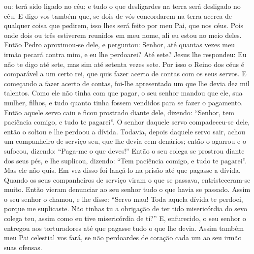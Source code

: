 {{ou: terá sido ligado
} no céu; e tudo o que desligardes na terra será desligado
 no céu.
  E digo-vos também que, se dois de vós concordarem na terra acerca de qualquer coisa que pedirem, isso lhes será feito por meu Pai, que
{} nos céus.
  Pois onde dois ou três estiverem reunidos em meu nome, ali eu estou no meio deles.
  Então Pedro aproximou-se dele, e perguntou: Senhor, até quantas vezes meu irmão pecará contra mim, e eu lhe perdoarei? Até sete?
  Jesus lhe respondeu: Eu não te digo até sete, mas sim até setenta vezes sete.
  Por isso o Reino dos céus é comparável a um certo rei, que quis fazer acerto de contas com os seus servos.
  E começando a fazer acerto de contas, foi-lhe apresentado um que lhe devia dez mil talentos.
  Como ele não tinha com que pagar, o seu senhor mandou que ele, sua mulher, filhos, e tudo quanto tinha fossem vendidos para se fazer o pagamento.
  Então aquele servo caiu e ficou prostrado diante dele, dizendo: “Senhor, tem paciência comigo, e tudo te pagarei”.
  O senhor daquele servo compadeceu-se dele, então o soltou e lhe perdoou a dívida.
  Todavia, depois daquele servo sair, achou um companheiro de serviço seu, que lhe devia cem denários;
 então o agarrou e o sufocou, dizendo: “Paga-me o que
{} deves!”
  Então o seu colega se prostrou diante dos seus pés, e lhe suplicou, dizendo: “Tem paciência comigo, e tudo te pagarei”.
  Mas ele não quis. Em vez disso foi lançá-lo na prisão até que pagasse a dívida.
  Quando os seus companheiros de serviço viram o que se passava, entristeceram-se muito. Então vieram denunciar ao seu senhor tudo o que havia se passado.
  Assim o seu senhor o chamou, e lhe disse: “Servo mau! Toda aquela dívida te perdoei, porque me suplicaste.
  Não tinhas tu a obrigação de ter tido misericórdia do sevo colega teu, assim como eu tive misericórdia de ti?”
  E, enfurecido, o seu senhor o entregou aos torturadores até que pagasse tudo o que lhe devia.
  Assim também meu Pai celestial vos fará, se não perdoardes de coração cada um ao seu irmão suas ofensas.
\par }

